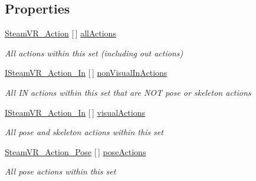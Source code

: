\subsection*{Properties}
\begin{DoxyCompactItemize}
\item 
\mbox{\hyperlink{class_valve_1_1_v_r_1_1_steam_v_r___action}{Steam\+V\+R\+\_\+\+Action}} \mbox{[}$\,$\mbox{]} \mbox{\hyperlink{class_valve_1_1_v_r_1_1_steam_v_r___action_set___data_a33aa78a713eee29f33de114f12f4ed99}{all\+Actions}}
\begin{DoxyCompactList}\small\item\em All actions within this set (including out actions) \end{DoxyCompactList}\item 
\mbox{\hyperlink{interface_valve_1_1_v_r_1_1_i_steam_v_r___action___in}{I\+Steam\+V\+R\+\_\+\+Action\+\_\+\+In}} \mbox{[}$\,$\mbox{]} \mbox{\hyperlink{class_valve_1_1_v_r_1_1_steam_v_r___action_set___data_ad4be45256c30ef6a6a3ffb3720ff477d}{non\+Visual\+In\+Actions}}
\begin{DoxyCompactList}\small\item\em All IN actions within this set that are N\+OT pose or skeleton actions \end{DoxyCompactList}\item 
\mbox{\hyperlink{interface_valve_1_1_v_r_1_1_i_steam_v_r___action___in}{I\+Steam\+V\+R\+\_\+\+Action\+\_\+\+In}} \mbox{[}$\,$\mbox{]} \mbox{\hyperlink{class_valve_1_1_v_r_1_1_steam_v_r___action_set___data_a16fdd46dfe641ebedacfb06d46cc1749}{visual\+Actions}}
\begin{DoxyCompactList}\small\item\em All pose and skeleton actions within this set \end{DoxyCompactList}\item 
\mbox{\hyperlink{class_valve_1_1_v_r_1_1_steam_v_r___action___pose}{Steam\+V\+R\+\_\+\+Action\+\_\+\+Pose}} \mbox{[}$\,$\mbox{]} \mbox{\hyperlink{class_valve_1_1_v_r_1_1_steam_v_r___action_set___data_a8a160d48ee6e95f8d4208dc269731cb2}{pose\+Actions}}
\begin{DoxyCompactList}\small\item\em All pose actions within this set \end{DoxyCompactList}\item 

\end{DoxyCompactItemize}
